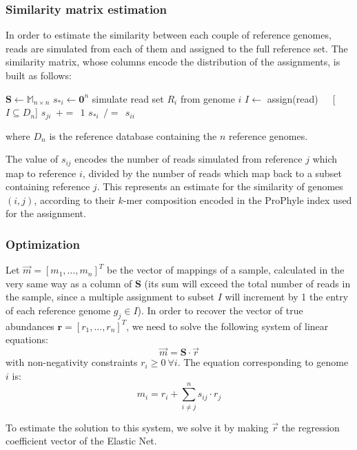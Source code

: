 \subsubsection{Similarity matrix estimation}
In order to estimate the similarity between each couple of reference genomes, reads are simulated from each of them and assigned to the full reference set. The similarity matrix, whose columns encode the distribution of the assignments, is built as follows:
\begin{algorithmic}
\State $\mathbf{S} \gets \mathbb{M}_{n\times n}$
\State $s_{*i} \gets \mathbf{0}^n$
\State simulate read set $R_i$ from genome $i$
\State $I \gets$ assign(read)~~~[$I \subseteq D_n$]
\State $s_{ji}~~{+=}~~1$
\EndFor
\EndFor
$s_{*i}~~{/=}~~s_{ii}$
\EndFor
\end{algorithmic}
where $D_n$ is the reference database containing the $n$ reference genomes.

The value of $s_{ij}$ encodes the number of reads simulated from reference $j$ which map to reference $i$, divided by the number of reads which map back to a subset containing reference $j$. This represents an estimate for the similarity of genomes $(i,j)$, according to their $k$-mer composition encoded in the ProPhyle index used for the assignment.

\subsubsection{Optimization}
Let $\vec{m} = [m_1, \dots, m_n]^T$ be the vector of mappings of a sample, calculated in the very same way as a column of $\boldsymbol{S}$ (its sum will exceed the total number of reads in the sample, since a multiple assignment to subset $I$ will increment by 1 the entry of each reference genome $g_j \in I$). In order to recover the vector of true abundances $\mathbf{r} = [r_1, \dots, r_n]^T$, we need to solve the following system of linear equations:
\begin{equation*}
  \vec{m} = \boldsymbol{S} \cdot \vec{r}
\end{equation*}
with non-negativity constraints $r_i \geq 0~\forall i$. The equation corresponding to genome $i$ is:
\begin{equation*}
  m_i = r_i + \sum_{i \neq j}^n s_{ij} \cdot r_j
\end{equation*}

To estimate the solution to this system, we solve it by making $\vec{r}$ the regression coefficient vector of the Elastic Net.

